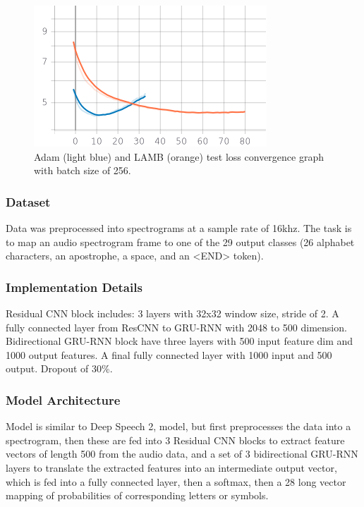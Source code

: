 \begin{figure}[!t]
    \centering
    \includegraphics[width=0.7\linewidth]{img/adam_blue_lamb_orange_drqa_256.png}
    \caption{Adam (light blue) and LAMB (orange) test loss convergence graph with batch size of 256.}
    \label{fig:256}
\end{figure}

\subsubsection{Dataset}

Data was preprocessed into spectrograms at a sample rate of 16khz. The task is to map an audio spectrogram frame to one of the 29 output classes (26 alphabet characters, an apostrophe, a space, and an <END> token). 


\subsubsection{Implementation Details}

Residual CNN block includes: 3 layers with 32x32 window size, stride of 2. A fully connected layer from ResCNN to GRU-RNN with 2048 to 500 dimension. Bidirectional GRU-RNN block have three layers with 500 input feature dim and 1000 output features. A final fully connected layer with 1000 input and 500 output. Dropout of 30\%.

\subsubsection{Model Architecture}

Model is similar to Deep Speech 2, model, but first preprocesses the data into a spectrogram, then these are fed into 3 Residual CNN blocks to extract feature vectors of length 500 from the audio data, and a set of 3 bidirectional GRU-RNN layers to translate the extracted features into an intermediate output vector, which is fed into a fully connected layer, then a softmax, then a 28 long vector mapping of probabilities of corresponding letters or symbols.


